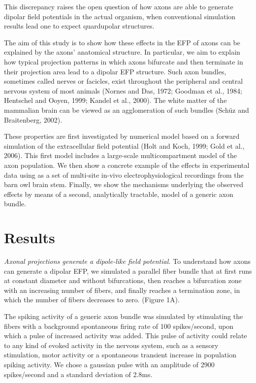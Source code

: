 \documentclass[]{article}
\begin{document}
This discrepancy raises the open question of how axons are able to
generate dipolar field potentials in the actual organism, when
conventional simulation results lead one to expect quardupolar
structures.

The aim of this study is to show how these effects in the EFP of axons
can be explained by the axons' anatomical structure. In particular, we
aim to explain how typical projection patterns in which axons bifurcate
and then terminate in their projection area lead to a dipolar EFP
structure. Such axon bundles, sometimes called nerves or facicles, exist
throughout the peripheral and central nervous system of most animals
(Nornes and Das, 1972; Goodman et al., 1984; Hentschel and Ooyen, 1999;
Kandel et al., 2000). The white matter of the mammalian brain can be
viewed as an agglomeration of such bundles (Schüz and Braitenberg,
2002).

These properties are first investigated by numerical model based on a
forward simulation of the extracellular field potential (Holt and Koch,
1999; Gold et al., 2006). This first model includes a large-scale
multicompartment model of the axon population. We then show a concrete
example of the effects in experimental data using as a set of multi-site
in-vivo electrophysiological recordings from the barn owl brain stem.
Finally, we show the mechanisms underlying the observed effects by means
of a second, analytically tractable, model of a generic axon bundle.

\section{Results}\label{results}

\emph{Axonal projections generate a dipole-like field potential.} To
understand how axons can generate a dipolar EFP, we simulated a parallel
fiber bundle that at first runs at constant diameter and without
bifurcations, then reaches a bifurcation zone with an increasing number
of fibers, and finally reaches a termination zone, in which the number
of fibers decreases to zero. (Figure 1A).

The spiking activity of a generic axon bundle was simulated by
stimulating the fibers with a background spontaneous firing rate of 100
spikes/second, upon which a pulse of increased activity was added. This
pulse of activity could relate to any kind of evoked activity in the
nervous system, such as a sensory stimulation, motor activity or a
spontaneous transient increase in population spiking activity. We chose
a gaussian pulse with an amplitude of 2900 spikes/second and a standard
deviation of 2.8ms.
\end{document}

